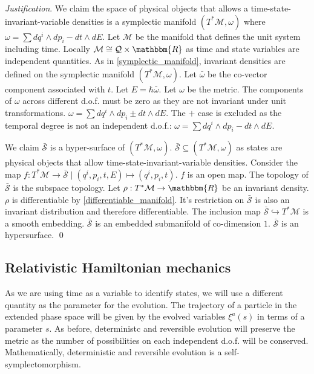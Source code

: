 \documentclass[aps,pra,10pt,twocolumn,floatfix,nofootinbib]{revtex4-1}
\numberwithin{equation}{section}
\theoremstyle{definition}
\newenvironment{justification}{\emph{Justification}.}{\qed}
\begin{document}
\begin{justification}
	We claim the space of physical objects that allows a time-state-invariant-variable densities is a symplectic manifold $(T^*\mathcal{M}, \omega)$ where $\omega = \sum dq^i \wedge dp_i - dt \wedge dE$. Let $\mathcal{M}$ be the manifold that defines the unit system including time. Locally $\mathcal{M} \cong \mathcal{Q} \times \mathbbm{R}$ as time and state variables are independent quantities. As in \ref{symplectic_manifold}, invariant densities are defined on the symplectic manifold $(T^*\mathcal{M}, \omega)$. Let $\bar{\omega}$ be the co-vector component associated with $t$. Let $E=\hbar \bar{\omega}$. Let $\omega$ be the metric. The components of $\omega$ across different d.o.f. must be zero as they are not invariant under unit transformations. $\omega=\sum dq^i \wedge dp_i \pm dt \wedge dE$. The $+$ case is excluded as the temporal degree is not an independent d.o.f.: $\omega = \sum dq^i \wedge dp_i - dt \wedge dE$.
	
	We claim $\bar{\mathcal{S}}$ is a hyper-surface of $(T^*\mathcal{M}, \omega)$. $\bar{\mathcal{S}} \subseteq (T^*\mathcal{M}, \omega)$ as states are physical objects that allow time-state-invariant-variable densities. Consider the map $f : T^*\mathcal{M} \rightarrow \bar{\mathcal{S}} \; | \; (q^i, p_i, t, E) \mapsto (q^i, p_i, t)$. $f$ is an open map. The topology of $\bar{\mathcal{S}}$ is the subspace topology. Let $\rho : T^*\mathcal{M} \rightarrow \mathbbm{R}$ be an invariant density. $\rho$ is differentiable by \ref{differentiable_manifold}. It's restriction on $\bar{\mathcal{S}}$ is also an invariant distribution and therefore differentiable. The inclusion map $\bar{\mathcal{S}} \hookrightarrow T^*\mathcal{M}$ is a smooth embedding. $\bar{\mathcal{S}}$ is an embedded submanifold of co-dimension $1$. $\bar{\mathcal{S}}$ is an hypersurface.
\end{justification}


\subsection{Relativistic Hamiltonian mechanics}

As we are using time as a variable to identify states, we will use a different quantity as the parameter for the evolution. The trajectory of a particle in the extended phase space will be given by the evolved variables $\xi^a(s)$ in terms of a parameter $s$. As before, deterministc and reversible evolution will preserve the metric as the number of possibilities on each independent d.o.f. will be conserved. Mathematically, deterministic and reversible evolution is a self-symplectomorphism.
\end{document}
